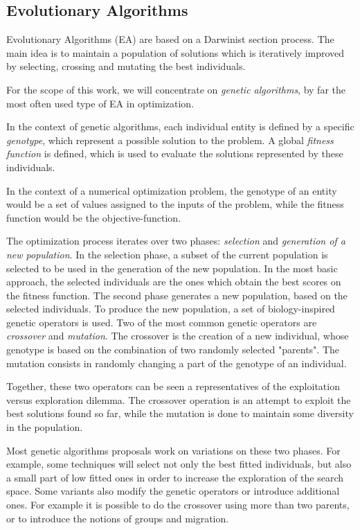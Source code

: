 \subsection{Evolutionary Algorithms}

Evolutionary Algorithms (EA) are based on a Darwinist section process. The main idea is to maintain a population of solutions which is iteratively improved by selecting, crossing and mutating the best individuals.

For the scope of this work, we will concentrate on \emph{genetic algorithms}, by far the most often used type of EA in optimization.

In the context of genetic algorithms, each individual entity is defined by a specific \emph{genotype}, which represent a possible solution to the problem.
A global \emph{fitness function} is defined, which is used to evaluate the solutions represented by these individuals.

In the context of a numerical optimization problem, the genotype of an entity would be a set of values assigned to the inputs of the problem, while the fitness function would be the objective-function.

The optimization process iterates over two phases: \emph{selection} and \emph{generation of a new population}.
In the selection phase, a subset of the current population is selected to be used in the generation of the new population. In the most basic approach, the selected individuals are the ones which obtain the best scores on the fitness function.
The second phase generates a new population, based on the selected individuals. To produce the new population, a set of biology-inspired genetic operators is used. Two of the most common genetic operators are \emph{crossover} and \emph{mutation}. The crossover is the creation of a new individual, whose genotype is based on the combination  of two randomly selected "parents". The mutation consists in randomly changing a part of the genotype of an individual.

Together, these two operators can be seen a representatives of the exploitation versus exploration dilemma. The crossover operation is an attempt to exploit the best solutions found so far, while the mutation is done to maintain some diversity in the population. 

Most genetic algorithms proposals work on variations on these two phases. For example, some techniques will select not only the best fitted individuals, but also a small part of low fitted ones in order to increase the exploration of the search space. Some variants also modify the genetic operators or introduce additional ones. For example it is possible to do the crossover using more than two parents, or to introduce the notions of groups and migration.

